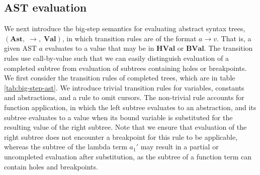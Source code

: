 \subsection*{AST evaluation}
\begin{sloppypar}
We next introduce the big-step semantics for evaluating abstract syntax trees, $\left(\mathbf{Ast},\; \rightarrow,\; \mathbf{Val}\right)$, in which transition rules are of the format $a \rightarrow v$. That is, a given AST $a$ evaluates to a value that may be in $\mathbf{HVal}$ or $\mathbf{BVal}$. The transition rules use call-by-value such that we can easily distinguish evaluation of a completed subtree from evaluation of subtrees containing holes or breakpoints.\\

We first consider the transition rules of completed trees, which are in table \ref{tab:big-step-ast}. We introduce trivial transition rules for variables, constants and abstractions, and a rule to omit cursors. The non-trivial rule  accounts for function application, in which the left subtree evaluates to an abstraction, and its subtree evaluates to a value when its bound variable is substituted for the resulting value of the right subtree. Note that we ensure that evaluation of the right subtree does not encounter a breakpoint for this rule to be applicable, whereas the subtree of the lambda term $a_1'$ may result in a partial or uncompleted evaluation after substitution, as the subtree of a function term can contain holes and breakpoints.
\end{sloppypar}
\vspace*{-0.8cm}
%
